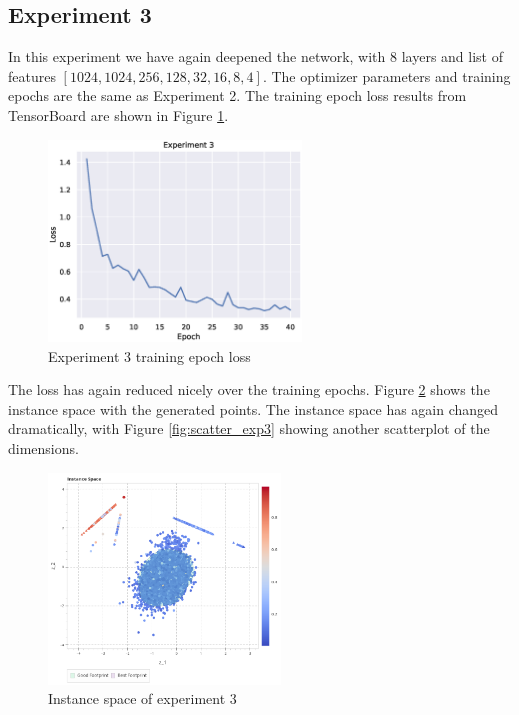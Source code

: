 \subsection{Experiment 3}

In this experiment we have again deepened the network, with 8 layers and list of features $[1024, 1024, 256, 128, 32, 16, 8, 4]$. The optimizer parameters and training epochs are the same as Experiment 2. The training epoch loss results from TensorBoard are shown in Figure \ref{fig:exp3}.

\begin{figure}[H]
    \centering
    \includegraphics[width=0.6\textwidth]{Cap5/loss_exp3}
    \caption{Experiment 3 training epoch loss}
    \label{fig:exp3}
\end{figure}

The loss has again reduced nicely over the training epochs. Figure \ref{fig:is_exp3} shows the instance space with the generated points. The instance space has again changed dramatically, with Figure \ref{fig:scatter_exp3} showing another scatterplot of the dimensions.

\begin{figure}[H]
    \centering
    \includegraphics[width=0.55\textwidth]{Cap5/is_exp3.png}
    \caption{Instance space of experiment 3}
    \label{fig:is_exp3}
\end{figure}

